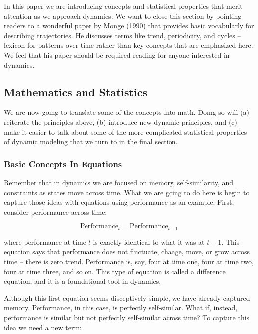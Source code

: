 \documentclass[english,,man]{apa6}
\theoremstyle{definition}
\theoremstyle{definition}
\theoremstyle{definition}
\theoremstyle{remark}
\begin{document}
In this paper we are introducing concepts and statistical properties
that merit attention as we approach dynamics. We want to close this
section by pointing readers to a wonderful paper by Monge (1990) that
provides basic vocabularly for describing trajectories. He discusses
terms like trend, periodicity, and cycles -- lexicon for patterns over
time rather than key concepts that are emphasized here. We feel that his
paper should be required reading for anyone interested in dynamics.

\hypertarget{mathematics-and-statistics}{%
\subsection{Mathematics and
Statistics}\label{mathematics-and-statistics}}

We are now going to translate some of the concepts into math. Doing so
will (a) reiterate the principles above, (b) introduce new dynamic
principles, and (c) make it easier to talk about some of the more
complicated statistical properties of dynamic modeling that we turn to
in the final section.

\hypertarget{basic-concepts-in-equations}{%
\subsubsection{Basic Concepts In
Equations}\label{basic-concepts-in-equations}}

Remember that in dynamics we are focused on memory, self-similarity, and
constraints as states move across time. What we are going to do here is
begin to capture those ideas with equations using performance as an
example. First, consider performance across time:

\begin{equation}
\textrm{Performance}_{t} = \textrm{Performance}_{t-1}
\end{equation}

\noindent where performance at time \(t\) is exactly identical to what
it was at \(t-1\). This equation says that performance does not
fluctuate, change, move, or grow across time -- there is zero trend.
Performance is, say, four at time one, four at time two, four at time
three, and so on. This type of equation is called a difference equation,
and it is a foundational tool in dynamics.

Although this first equation seems disceptively simple, we have already
captured memory. Performance, in this case, is perfectly self-similar.
What if, instead, performance is similar but not perfectly self-similar
across time? To capture this idea we need a new term:
\end{document}
